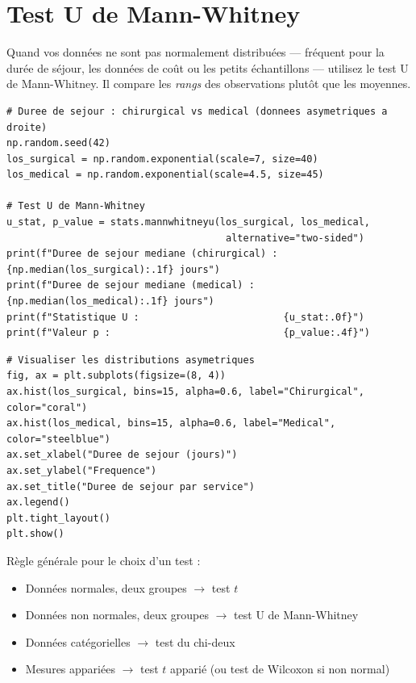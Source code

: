 \section{Test U de Mann-Whitney}

Quand vos donn\'ees ne sont pas normalement distribu\'ees --- fr\'equent pour la dur\'ee de s\'ejour, les donn\'ees de co\^ut ou les petits \'echantillons --- utilisez le test U de Mann-Whitney. Il compare les \emph{rangs} des observations plut\^ot que les moyennes.

\begin{verbatim}
# Duree de sejour : chirurgical vs medical (donnees asymetriques a droite)
np.random.seed(42)
los_surgical = np.random.exponential(scale=7, size=40)
los_medical = np.random.exponential(scale=4.5, size=45)

# Test U de Mann-Whitney
u_stat, p_value = stats.mannwhitneyu(los_surgical, los_medical,
                                      alternative="two-sided")
print(f"Duree de sejour mediane (chirurgical) : {np.median(los_surgical):.1f} jours")
print(f"Duree de sejour mediane (medical) :     {np.median(los_medical):.1f} jours")
print(f"Statistique U :                         {u_stat:.0f}")
print(f"Valeur p :                              {p_value:.4f}")
\end{verbatim}

\begin{verbatim}
# Visualiser les distributions asymetriques
fig, ax = plt.subplots(figsize=(8, 4))
ax.hist(los_surgical, bins=15, alpha=0.6, label="Chirurgical", color="coral")
ax.hist(los_medical, bins=15, alpha=0.6, label="Medical", color="steelblue")
ax.set_xlabel("Duree de sejour (jours)")
ax.set_ylabel("Frequence")
ax.set_title("Duree de sejour par service")
ax.legend()
plt.tight_layout()
plt.show()
\end{verbatim}

\begin{pythontip}
R\`egle g\'en\'erale pour le choix d'un test :
\begin{itemize}
  \item Donn\'ees normales, deux groupes $\rightarrow$ test $t$
  \item Donn\'ees non normales, deux groupes $\rightarrow$ test U de Mann-Whitney
  \item Donn\'ees cat\'egorielles $\rightarrow$ test du chi-deux
  \item Mesures appari\'ees $\rightarrow$ test $t$ appari\'e (ou test de Wilcoxon si non normal)
\end{itemize}
\end{pythontip}


